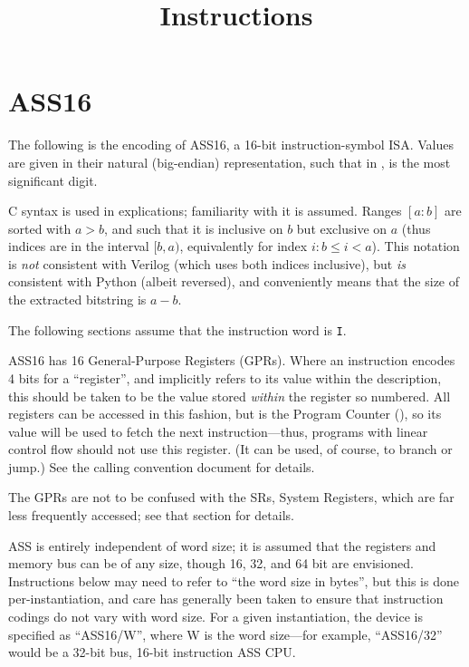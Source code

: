 

\title{Instructions}

\def\ins{{\tt I}}
\def\rg#1,#2.{$[#1:#2]$}
\def\ix#1{$[#1]$}

\chapter{ASS16}

The following is the encoding of ASS16, a 16-bit instruction-symbol ISA. Values
are given in their natural (big-endian) representation, such that in
,  is the most significant digit.

\bigskip
{
}
\bigskip

C syntax is used in explications; familiarity with it is assumed. Ranges
\rg a,b. are sorted with $a > b$, and such that it is inclusive on $b$ but
exclusive on $a$ (thus indices are in the interval $[b, a)$, equivalently for
index $i: b \le i < a$). This notation is {\it not} consistent with Verilog
(which uses both indices inclusive), but {\it is} consistent with Python
(albeit reversed), and conveniently means that the size of the extracted
bitstring is $a - b$.

The following sections assume that the instruction word is \ins.

ASS16 has 16 General-Purpose Registers (GPRs). Where an instruction encodes 4
bits for a ``register'', and implicitly refers to its value within the
description, this should be taken to be the value stored {\it within} the
register so numbered. All registers can be accessed in this fashion, but
 is the Program Counter (), so its value will be used to fetch
the next instruction---thus, programs with linear control flow should not use
this register. (It can be used, of course, to branch or jump.) See the calling
convention document for details.

The GPRs are not to be confused with the SRs, System Registers, which are far
less frequently accessed; see that section for details.

ASS is entirely independent of word size; it is assumed that the registers and
memory bus can be of any size, though 16, 32, and 64 bit are envisioned.
Instructions below may need to refer to ``the word size in bytes'', but this is
done per-instantiation, and care has generally been taken to ensure that
instruction codings do not vary with word size. For a given instantiation, the
device is specified as ``ASS16/W'', where W is the word size---for example,
``ASS16/32'' would be a 32-bit bus, 16-bit instruction ASS CPU.

